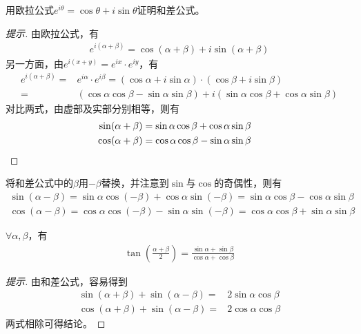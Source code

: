 \begin{example}
  用欧拉公式$e^{i\theta} = \cos\theta + i\sin\theta$证明和差公式。
\end{example}
\begin{proof}[提示]由欧拉公式，有
  \begin{align*}
    e^{i(\alpha + \beta)} = \cos(\alpha + \beta) + i\sin(\alpha + \beta)
  \end{align*}
  另一方面，由$e^{i(x+y)} = e^{ix}\cdot e^{iy}$，有
  \begin{align*}
    e^{i(\alpha + \beta)} ={}& e^{i\alpha}\cdot e^{i\beta}
    = \left( \cos\alpha + i\sin\alpha \right) \cdot \left( \cos\beta + i\sin\beta \right)\\
    ={}& (\cos\alpha\cos\beta - \sin\alpha\sin\beta) + i(\sin\alpha\cos\beta + \cos\alpha\sin\beta)
  \end{align*}
  对比两式，由虚部及实部分别相等，则有
  \begin{align*}
    \sin(\alpha+\beta) = \sin\alpha\cos\beta + \cos\alpha\sin\beta\\
    \cos(\alpha+\beta) = \cos\alpha\cos\beta - \sin\alpha\sin\beta    &\qedhere
  \end{align*}
\end{proof}

\begin{example}
  将和差公式中的$\beta$用$-\beta$替换，并注意到$\sin$与$\cos$的奇偶性，则有
  \begin{align*}
    \sin(\alpha-\beta) = \sin\alpha\cos(-\beta) + \cos\alpha\sin(-\beta) = \sin\alpha\cos\beta - \cos\alpha\sin\beta\\
    \cos(\alpha-\beta) = \cos\alpha\cos(-\beta) - \sin\alpha\sin(-\beta) = \cos\alpha\cos\beta + \sin\alpha\sin\beta
  \end{align*}
\end{example}

\begin{example}
  $\forall \alpha, \beta$，有
  \begin{align*}
    \tan\left(\frac{\alpha + \beta}{2}\right) = \frac{\sin\alpha + \sin\beta}{\cos\alpha + \cos\beta}
  \end{align*}
\end{example}
\begin{proof}[提示]
  由和差公式，容易得到
  \begin{align*}
    \sin(\alpha + \beta) + \sin(\alpha - \beta) ={}& 2 \sin\alpha\cos\beta \\
    \cos(\alpha + \beta) + \sin(\alpha - \beta) ={}& 2 \cos\alpha\cos\beta
  \end{align*}
  两式相除可得结论。
\end{proof}

